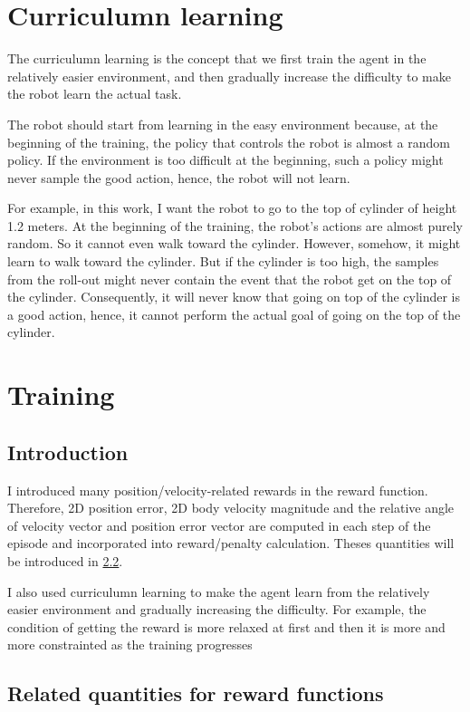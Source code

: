 \documentclass{article}
\begin{document}
\section{Curriculumn learning}
    The curriculumn learning is the concept that we first train the agent in the relatively easier environment, and then gradually 
increase the difficulty to make the robot learn the actual task. 
    
    The robot should start from learning in the easy environment because, at the beginning of the training, 
the policy that controls the robot is almost a random policy. If the environment is too difficult at the beginning, such a policy
might never sample the good action, hence, the robot will not learn.

    For example, in this work, I want the robot to go to the top of cylinder of height 1.2 meters. At the beginning of the training, 
the robot's actions are almost purely random. So it cannot even walk toward the cylinder. 
However, somehow, it might learn to walk toward the cylinder. But if the cylinder is too high, 
the samples from the roll-out might never contain the event that the robot get on the top of the cylinder. 
Consequently, it will never know that going on top of the cylinder is a good action, 
hence, it cannot perform the actual goal of going on the top of the cylinder.


\section{Training}

    \subsection{Introduction}
        I introduced many position/velocity-related rewards in the reward function. Therefore, 2D position error, 
    2D body velocity magnitude and the relative angle of velocity vector and position error vector 
    are computed in each step of the episode and incorporated into reward/penalty calculation.
    Theses quantities will be introduced in \ref{subsec:related_quan}.

        I also used curriculumn learning to make the agent learn from the relatively easier environment and gradually increasing the difficulty. 
    For example, the condition of getting the reward is more relaxed at first and then it is more and more constrainted as the training progresses

    \subsection{Related quantities for reward functions}
    \label{subsec:related_quan}
\end{document}
